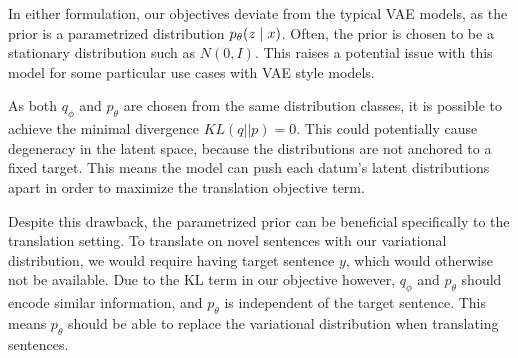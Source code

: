 



In either formulation, our objectives deviate from the typical VAE models, as the prior is a parametrized distribution $p_{\theta}(z \; | \;{x})$. Often, the prior is chosen to be a stationary distribution such as $N(0, I)$. This raises a potential issue with this model for some particular use cases with \ac{VAE} style models. 

As both $q_{\phi}$ and $p_{\theta}$ are chosen from the same distribution classes, it is possible to achieve the minimal divergence $KL(q || p) = 0$. This could potentially cause degeneracy in the latent space, because the distributions are not anchored to a fixed target. This means the model can push each datum's latent distributions apart in order to maximize the translation objective term. %

Despite this drawback, the parametrized prior can be beneficial specifically to the translation setting. To translate on novel sentences with our variational distribution, we would require having target sentence $y$, which would otherwise not be available. Due to the KL term in our objective however, $q_{\phi}$ and $p_{\theta}$ should encode similar information, and $p_{\theta}$ is independent of the target sentence. This means $p_{\theta}$ should be able to replace the variational distribution when translating sentences. %

